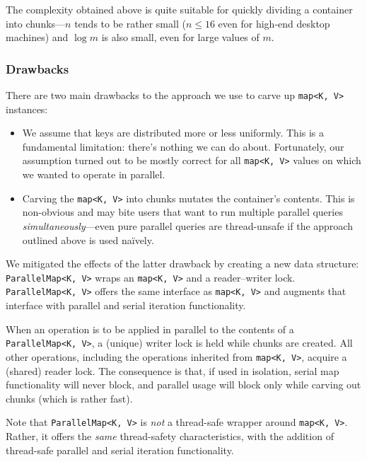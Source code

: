\documentclass[a4paper,12pt]{article}
\newcommand{\typename}[2]{\texttt{#2}} %
\begin{document}
The complexity obtained above is quite suitable for quickly dividing a container into chunks---$n$ tends to be rather small ($n \le 16$ even for high-end desktop machines) and $\log m$ is also small, even for large values of $m$.

\subsubsection{Drawbacks}

There are two main drawbacks to the approach we use to carve up \typename{std}{map<K, V>} instances:

\begin{itemize}
	\item We assume that keys are distributed more or less uniformly. This is a fundamental limitation: there's nothing we can do about. Fortunately, our assumption turned out to be mostly correct for all \typename{std}{map<K, V>} values on which we wanted to operate in parallel.
	
	\item Carving the \typename{std}{map<K, V>} into chunks mutates the container's contents. This is non-obvious and may bite users that want to run multiple parallel queries \emph{simultaneously}---even pure parallel queries are thread-unsafe if the approach outlined above is used na\"ively.
\end{itemize}

We mitigated the effects of the latter drawback by creating a new data structure: \typename{stride::util::parallel}{ParallelMap<K, V>} wraps an \typename{std}{map<K, V>} and a reader--writer lock. \typename{stride::util::parallel}{ParallelMap<K, V>} offers the same interface as \typename{std}{map<K, V>} and augments that interface with parallel and serial iteration functionality.

When an operation is to be applied in parallel to the contents of a \typename{stride::util::parallel}{ParallelMap<K, V>}, a (unique) writer lock is held while chunks are created. All other operations, including the operations inherited from \typename{std}{map<K, V>}, acquire a (shared) reader lock. The consequence is that, if used in isolation, serial map functionality will never block, and parallel usage will block only while carving out chunks (which is rather fast).

Note that \typename{stride::util::parallel}{ParallelMap<K, V>} is \emph{not} a thread-safe wrapper around \typename{std}{map<K, V>}. Rather, it offers the \emph{same} thread-safety characteristics, with the addition of thread-safe parallel and serial iteration functionality.
\end{document}
